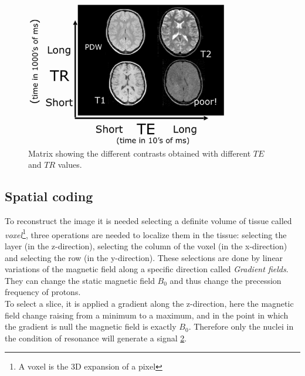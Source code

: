  \begin{figure}[h]
    \centering
    \includegraphics[width=0.8\textwidth]{images/matrix_contrast.png}
    \caption{Matrix showing the different contrasts obtained with different $TE$ and $TR$ values. \cite{matrixContrast}}
    \label{fig:matrixTR_TE}
 \end{figure}

 \subsection{Spatial coding}
 To reconstruct the image it is needed selecting a definite volume of tissue called \emph{voxel}\footnote{A voxel is the 3D expansion of a pixel}, three operations are needed to localize them in the tissue: selecting the layer (in the z-direction), selecting the column of the voxel (in the x-direction) and selecting the row (in the y-direction).
 These selections are done by linear variations of the magnetic field along a specific direction called \emph{Gradient fields}. They can change the static magnetic field $B_0$ and thus change the precession frequency of protons.\\
 
 \noindent To select a slice, it is applied a gradient along the z-direction, here the magnetic field change raising from a minimum to a maximum, and in the point in which the gradient is null the magnetic field is exactly $B_0$. Therefore only the nuclei in the condition of resonance will generate a signal \ref{fig:gradientZ}.

 \begin{figure}[h]
    \centering
    \caption{}
    \label{fig:gradientZ}
 \end{figure}

